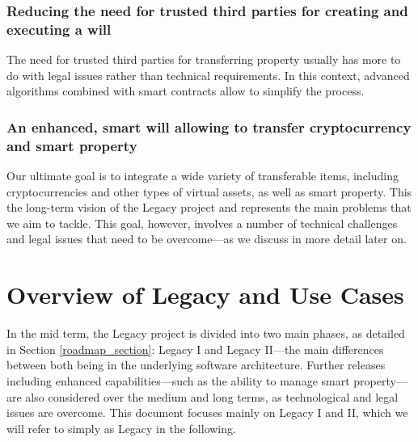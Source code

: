 \subsubsection*{Reducing the need for trusted third parties for creating and executing a will} %
\label{ssub:reducing_the_need_for_trusted_third_parties_for_creating_and_executing_a_will}
The need for trusted third parties for transferring property usually has more to do with legal issues rather than technical requirements. In this context, advanced algorithms combined with smart contracts allow to simplify the process.

\subsubsection*{An enhanced, smart will allowing to transfer cryptocurrency and smart property} %
\label{ssub:_an_enhanced_smart_will_allowing_to_transfer_cryptocurrency_and_smart_property_}
Our ultimate goal is to integrate a wide variety of transferable items, including cryptocurrencies and other types of virtual assets, as well as smart property. This the long-term vision of the Legacy project and represents the main problems that we aim to tackle. This goal, however, involves a number of technical challenges and legal issues that need to be overcome---as we discuss in more detail later on.


\section{Overview of Legacy and Use Cases} %
\label{sec:overview_of_legacy_and_use_cases}
In the mid term, the Legacy project is divided into two main phases, as detailed in Section \ref{roadmap_section}: Legacy I and Legacy II---the main differences between both being in the underlying software architecture.  Further releases including enhanced capabilities---such as the ability to manage smart property---are also considered over the medium and long terms, as technological and legal issues are overcome. This document focuses mainly on Legacy I and II, which we will refer to simply as Legacy in the following. 

